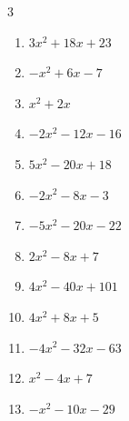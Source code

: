 \begin{multicols}{3}
\begin{enumerate}

  \item $3x^{2}+18x+23$


  \item $-x^{2}+6x-7$


  \item $x^{2}+2x$


  \item $-2x^{2}-12x-16$


\columnbreak %

\resetques

  \item $5x^{2}-20x+18$


  \item $-2x^{2}-8x-3$


  \item $-5x^{2}-20x-22$


  \item $2x^{2}-8x+7$


  \item $4x^{2}-40x+101$


  \item $4x^{2}+8x+5$


  \item $-4x^{2}-32x-63$


  \item $x^{2}-4x+7$


  \item $-x^{2}-10x-29$



\end{enumerate}
\end{multicols}
